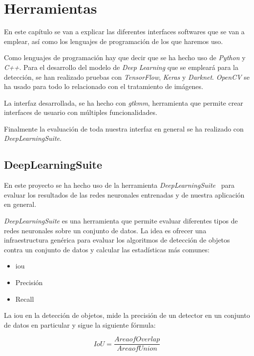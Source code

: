 \chapter{Herramientas}\label{cap.herramientas}
En este capítulo se van a explicar las diferentes interfaces softwares que se van a emplear, así como los lenguajes de programación de los que haremos uso.

Como lenguajes de programación hay que decir que se ha hecho uso de \textit{Python} y \textit{C++}. Para el desarrollo del modelo de \textit{Deep Learning} que se empleará para la detección, se han realizado pruebas con \textit{TensorFlow}, \textit{Keras} y \textit{Darknet}. \textit{OpenCV} se ha usado para todo lo relacionado con el tratamiento de imágenes.

La interfaz desarrollada, se ha hecho con \textit{gtkmm}, herramienta que permite crear interfaces de usuario con múltiples funcionalidades.

Finalmente la evaluación de toda nuestra interfaz en general se ha realizado con \textit{DeepLearningSuite}.



\section{DeepLearningSuite}
En este proyecto se ha hecho uso de la herramienta \textit{DeepLearningSuite}~\cite{detectionsuite} para evaluar los resultados de las redes neuronales entrenadas y de nuestra aplicación en general.

\textit{DeepLearningSuite} es una herramienta que permite evaluar diferentes tipos de redes neuronales sobre un conjunto de datos. La idea es ofrecer una infraestructura genérica para evaluar los algoritmos de detección de objetos contra un conjunto de datos y calcular las estadísticas más comunes:
\begin{itemize}
    \item \acrfull{iou}
    \item Precisión
    \item Recall
\end{itemize}

La \acrfull{iou} en la detección de objetos, mide la precisión de un detector en un conjunto de datos en particular y sigue la siguiente fórmula:

\begin{equation}\label{iou}
IoU = \frac{AreaofOverlap}{AreaofUnion}
\end{equation}

